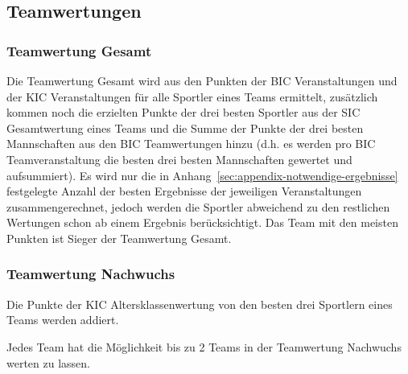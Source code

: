 \subsection{Teamwertungen}
\subsubsection{Teamwertung Gesamt}
\label{subsec:teamwertung-gesamt}
Die Teamwertung Gesamt wird aus den Punkten der BIC Veranstaltungen und der KIC Veranstaltungen für alle Sportler eines Teams ermittelt, zusätzlich kommen noch die erzielten Punkte der drei besten Sportler aus der SIC Gesamtwertung eines Teams und die Summe der Punkte der drei besten Mannschaften aus den BIC Teamwertungen hinzu (d.h. es werden pro BIC Teamveranstaltung die besten drei besten Mannschaften gewertet und aufsummiert). Es wird nur die in Anhang~\ref{sec:appendix-notwendige-ergebnisse} festgelegte Anzahl der besten Ergebnisse der jeweiligen Veranstaltungen zusammengerechnet, jedoch werden die Sportler abweichend zu den restlichen Wertungen schon ab einem Ergebnis berücksichtigt. Das Team mit den meisten Punkten ist Sieger der Teamwertung Gesamt.


\subsubsection{Teamwertung Nachwuchs}
\label{subsec:teamwertung-nachwuchs}
Die Punkte der KIC Altersklassenwertung von den besten drei Sportlern eines Teams werden addiert. 

Jedes Team hat die Möglichkeit bis zu 2 Teams in der Teamwertung Nachwuchs werten zu lassen.

